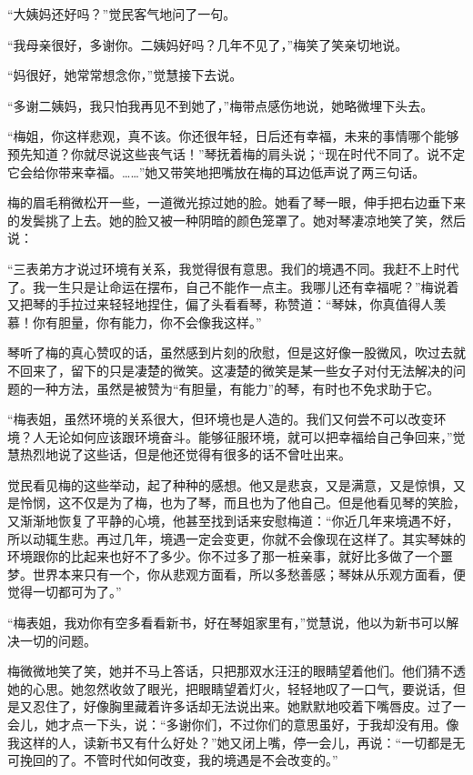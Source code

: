 \par “大姨妈还好吗？”觉民客气地问了一句。
\par “我母亲很好，多谢你。二姨妈好吗？几年不见了，”梅笑了笑亲切地说。
\par “妈很好，她常常想念你，”觉慧接下去说。
\par “多谢二姨妈，我只怕我再见不到她了，”梅带点感伤地说，她略微埋下头去。
\par “梅姐，你这样悲观，真不该。你还很年轻，日后还有幸福，未来的事情哪个能够预先知道？你就尽说这些丧气话！”琴抚着梅的肩头说；“现在时代不同了。说不定它会给你带来幸福。……”她又带笑地把嘴放在梅的耳边低声说了两三句话。
\par 梅的眉毛稍微松开一些，一道微光掠过她的脸。她看了琴一眼，伸手把右边垂下来的发鬓挑了上去。她的脸又被一种阴暗的颜色笼罩了。她对琴凄凉地笑了笑，然后说：
\par “三表弟方才说过环境有关系，我觉得很有意思。我们的境遇不同。我赶不上时代了。我一生只是让命运在摆布，自己不能作一点主。我哪儿还有幸福呢？”梅说着又把琴的手拉过来轻轻地捏住，偏了头看看琴，称赞道：“琴妹，你真值得人羡慕！你有胆量，你有能力，你不会像我这样。”
\par 琴听了梅的真心赞叹的话，虽然感到片刻的欣慰，但是这好像一股微风，吹过去就不回来了，留下的只是凄楚的微笑。这凄楚的微笑是某一些女子对付无法解决的问题的一种方法，虽然是被赞为“有胆量，有能力”的琴，有时也不免求助于它。
\par “梅表姐，虽然环境的关系很大，但环境也是人造的。我们又何尝不可以改变环境？人无论如何应该跟环境奋斗。能够征服环境，就可以把幸福给自己争回来，”觉慧热烈地说了这些话，但是他还觉得有很多的话不曾吐出来。
\par 觉民看见梅的这些举动，起了种种的感想。他又是悲哀，又是满意，又是惊惧，又是怜悯，这不仅是为了梅，也为了琴，而且也为了他自己。但是他看见琴的笑脸，又渐渐地恢复了平静的心境，他甚至找到话来安慰梅道：“你近几年来境遇不好，所以动辄生悲。再过几年，境遇一定会变更，你就不会像现在这样了。其实琴妹的环境跟你的比起来也好不了多少。你不过多了那一桩亲事，就好比多做了一个噩梦。世界本来只有一个，你从悲观方面看，所以多愁善感；琴妹从乐观方面看，便觉得一切都可为了。”
\par “梅表姐，我劝你有空多看看新书，好在琴姐家里有，”觉慧说，他以为新书可以解决一切的问题。
\par 梅微微地笑了笑，她并不马上答话，只把那双水汪汪的眼睛望着他们。他们猜不透她的心思。她忽然收敛了眼光，把眼睛望着灯火，轻轻地叹了一口气，要说话，但是又忍住了，好像胸里藏着许多话却无法说出来。她默默地咬着下嘴唇皮。过了一会儿，她才点一下头，说：“多谢你们，不过你们的意思虽好，于我却没有用。像我这样的人，读新书又有什么好处？”她又闭上嘴，停一会儿，再说：“一切都是无可挽回的了。不管时代如何改变，我的境遇是不会改变的。”
